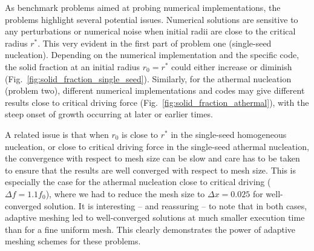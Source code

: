 \documentclass[preprint,12pt]{elsarticle}
\begin{document}
As benchmark problems aimed at probing numerical implementations, the problems highlight several potential issues. Numerical solutions are sensitive to any perturbations or numerical noise when initial radii are close to the critical radius $r^*$. This very evident in the first part of problem one (single-seed nucleation). Depending on the numerical implementation and the specific code, the solid fraction at an initial radius $r_0=r^*$ could either increase or diminish (Fig.~\ref{fig:solid_fraction_single_seed}). Similarly, for the athermal nucleation (problem two), different numerical implementations and codes may give different results close to critical driving force (Fig.~\ref{fig:solid_fraction_athermal}), with the steep onset of growth occurring at later or earlier times. 

A related issue is that when $r_0$ is close to $r^*$ in the single-seed homogeneous nucleation, or close to critical driving force in the single-seed athermal nucleation, the convergence with respect to mesh size can be slow and care has to be taken to ensure that the results are well converged with respect to mesh size. This is especially the case for the athermal nucleation close to critical driving ($\Delta f = 1.1 f_0$), where we had to reduce the mesh size to $\Delta x=0.025$ for well-converged solution. It is interesting -- and reassuring -- to note that in both cases, adaptive meshing led to well-converged solutions at much smaller execution time than for a fine uniform mesh. This clearly demonstrates the power of adaptive meshing schemes for these problems.
\end{document}

